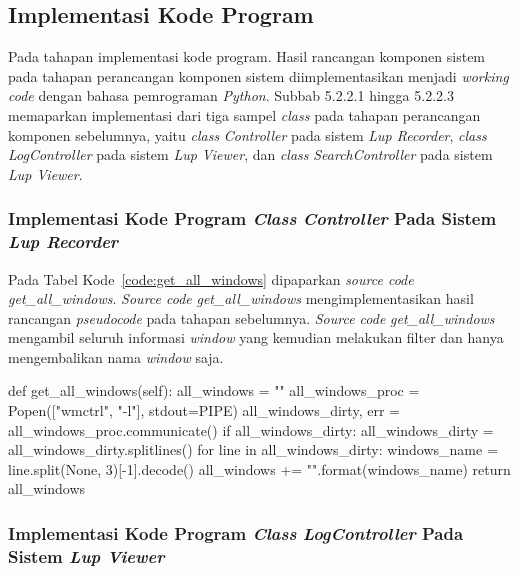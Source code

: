 \subsection{Implementasi Kode Program}

Pada tahapan implementasi kode program. Hasil rancangan komponen
sistem pada tahapan perancangan komponen sistem diimplementasikan
menjadi \emph{working code} dengan bahasa pemrograman \emph{Python}.
Subbab 5.2.2.1 hingga 5.2.2.3 memaparkan
implementasi dari tiga sampel \emph{class} pada tahapan perancangan
komponen sebelumnya, yaitu \emph{class} \emph{Controller} pada sistem
\emph{Lup Recorder}, \emph{class} \emph{LogController} pada sistem
\emph{Lup Viewer}, dan \emph{class} \emph{SearchController} pada
sistem \emph{Lup Viewer}.

\subsubsection{Implementasi Kode Program \emph{Class} \emph{Controller} Pada Sistem \emph{Lup Recorder}}

Pada Tabel Kode~\ref{code:get_all_windows} dipaparkan \emph{source
  code} \emph{get\_all\_windows}. \emph{Source code}
\emph{get\_all\_windows} mengimplementasikan hasil rancangan
\emph{pseudocode} pada tahapan sebelumnya. \emph{Source code}
\emph{get\_all\_windows} mengambil seluruh informasi \emph{window}
yang kemudian melakukan filter dan hanya mengembalikan nama
\emph{window} saja.

\par\null\par
\begin{code}
\begin{ignasicblock}[title=get\_all\_windows,minted language=Python]
def get_all_windows(self):
  all_windows = ""
  all_windows_proc = Popen(["wmctrl", "-l"], stdout=PIPE)
  all_windows_dirty, err = all_windows_proc.communicate()
  if all_windows_dirty:
    all_windows_dirty = all_windows_dirty.splitlines()
    for line in all_windows_dirty:
      windows_name = line.split(None, 3)[-1].decode()
      all_windows += "{}\n".format(windows_name)
  return all_windows
\end{ignasicblock}
    \label{code:get_all_windows}
\end{code}

\subsubsection{Implementasi Kode Program \emph{Class} \emph{LogController} Pada Sistem
  \emph{Lup Viewer}}

